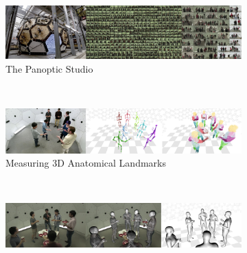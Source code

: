 %

\begin{figure}[t]
	\centering       
	\begin{subfigure}{\textwidth}
		\includegraphics[width=\textwidth]{figures/teaser_part1}
		\caption{The Panoptic Studio}
	\end{subfigure}\\
	\vspace{2pt}
	\begin{subfigure}{\textwidth}
		\includegraphics[width=\textwidth]{figures/teaser_part2}
		\caption{Measuring 3D Anatomical Landmarks}
	\end{subfigure}\\
	\vspace{2pt}
	\begin{subfigure}{\textwidth}
		\includegraphics[width=\textwidth]{figures/teaser_part3}

\end{subfigure}
\end{figure}
